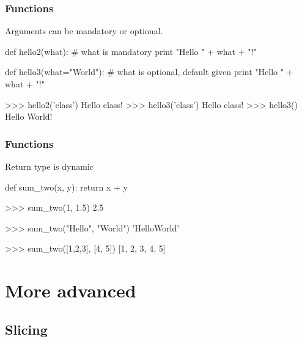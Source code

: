 \documentclass[xetex,10pt]{beamer}
\def\spacer{\vspace*{1em}}
\begin{document}
\begin{frame}[fragile]
	\frametitle{Functions}

	Arguments can be mandatory or optional.
	
\begin{python}
def hello2(what):			# what is mandatory
    print "Hello " + what + "!"

def hello3(what="World"):	# what is optional, default given
    print "Hello " + what + "!"
\end{python}

	\spacer
	\pause

\begin{python}
>>> hello2('class')
Hello class!
>>> hello3('class')
Hello class!
>>> hello3()
Hello World!
\end{python}
\end{frame}

\begin{frame}[fragile]
	\frametitle{Functions}
	Return type is dynamic

\begin{python}
def sum_two(x, y):
    return x + y
\end{python}

	\spacer

\begin{python}
>>> sum_two(1, 1.5)
2.5
\end{python}
\pause
\begin{python}
>>> sum_two("Hello", "World")
'HelloWorld'
\end{python}
\pause
\begin{python}
>>> sum_two([1,2,3], [4, 5])
[1, 2, 3, 4, 5]
\end{python}

\end{frame}

\section{More advanced}

\subsection{Slicing}
\end{document}
